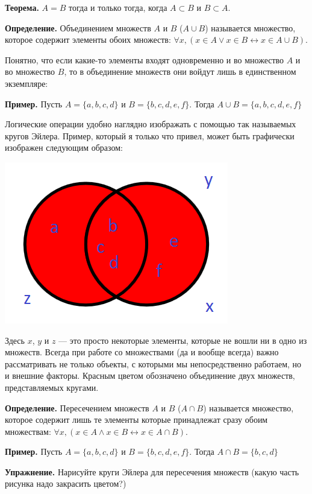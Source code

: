{\bfseries Теорема.}  $A=B$ тогда и только тогда, когда $A\subset B$ и $B \subset A$.

{\bfseries Определение.} Объединением множеств $A$ и $B$ ($A\cup B$) называется множество, которое содержит элементы обоих множеств: $\forall x, (x\in A \vee x \in B \leftrightarrow x\in A\cup B)$.

Понятно, что если какие-то элементы входят одновременно и во множество $A$ и во множество $B$, то в объединение множеств они войдут лишь в единственном экземпляре:

{\bfseries Пример.} Пусть $A = \{a, b, c, d\}$ и $B = \{b, c, d, e, f\}$. Тогда $A\cup B = \{a, b, c, d, e, f\}$

Логические операции удобно наглядно изображать с помощью так называемых кругов Эйлера. Пример, который я только что привел, может быть графически изображен следующим образом:

\includegraphics{sets-union.png}

Здесь $x$, $y$ и $z$ — это просто некоторые элементы, которые не вошли ни в одно из множеств. Всегда при работе со множествами (да и вообще всегда) важно рассматривать не только объекты, с которыми мы непосредственно работаем, но и внешние факторы. Красным цветом обозначено объединение двух множеств, представляемых кругами.

{\bfseries Определение.} Пересечением множеств $A$ и $B$ ($A\cap B$) называется множество, которое содержит лишь те элементы которые принадлежат сразу обоим множествам: $\forall x, (x\in A \wedge x \in B \leftrightarrow x\in A\cap B)$.

{\bfseries Пример.} Пусть $A = \{a, b, c, d\}$ и $B = \{b, c, d, e, f\}$. Тогда $A\cap B = \{b, c, d\}$

{\bfseries Упражнение.} Нарисуйте круги Эйлера для пересечения множеств (какую часть рисунка надо закрасить цветом?)

